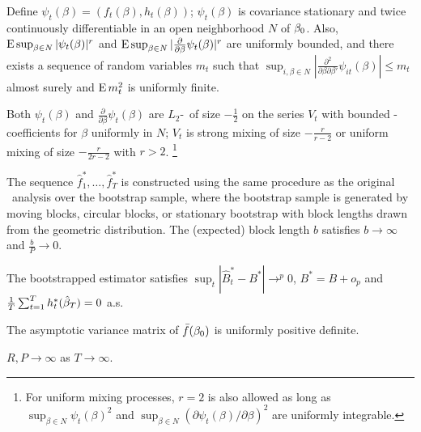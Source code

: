 \documentclass[12pt,fleqn]{article}
\begin{document}
\begin{asmp}\label{a2}
  Define $\psi_t(\beta) = (f_t(\beta), h_t(\beta))$; $\psi_t(\beta)$
  is covariance stationary and twice continuously differentiable in an
  open neighborhood $N$ of $\btrue$.  Also, $\operatorname{E} \sup_{\beta \in N}
  |\psi_t(\beta)|^r$ and $\operatorname{E}\sup_{\beta \in N}
  |\frac{\partial}{\partial \beta} \psi_t(\beta)|^r$ are uniformly
  bounded, and there exists a sequence of random variables $m_t$ such
  that $\sup_{i,\beta \in N} |\tfrac{\partial^2}{\partial
    \beta \partial \beta'} \psi_{it}(\beta)| \leq m_t$ almost surely
  and $\operatorname{E} m_t^2$ is uniformly finite.
\end{asmp}

\begin{asmp}\label{a3}
  Both $\psi_t(\beta)$ and $\frac{\partial}{\partial \beta}
  \psi_t(\beta)$ are $L_2$-\ned\ of size $-\frac12$ on the series
  $V_t$ with bounded \ned-coefficients for $\beta$ uniformly in $N$;
  $V_t$ is strong mixing of size $-\frac{r}{r-2}$ or uniform mixing of
  size $-\frac{r}{2r-2}$ with $r > 2$.%
  \footnote{For uniform mixing processes, $r = 2$ is also allowed as
    long as $\sup_{\beta \in N} \psi_t(\beta)^2$ and $\sup_{\beta \in
      N} (\partial \psi_t(\beta) / \partial \beta)^2$ are uniformly
    integrable.} %
\end{asmp}

\begin{asmp}\label{a4}
  The sequence $\hat f_1^{*},\dots,\hat f_T^{*}$ is constructed using
  the same procedure as the original \oos\ analysis over the bootstrap
  sample, where the bootstrap sample is generated by moving blocks,
  circular blocks, or stationary bootstrap with block lengths drawn
  from the geometric distribution.  The (expected) block length $b$
  satisfies $b \to \infty$ and $\frac{b}{P} \to 0$.
\end{asmp}

\begin{asmp}\label{a5}
  The bootstrapped estimator satisfies $\sup_t |\hat{B}_t^{*} - B^{*}|
  \to^p 0$, $B^{*} = B + o_p$ and $\frac1T \sum_{t=1}^T
  h_t^*(\btrue[*]) = 0$ a.s.
\end{asmp}

\begin{asmp}\label{a6}
  The asymptotic variance matrix of $\bar{f}(\btrue)$ is uniformly
  positive definite.
\end{asmp}

\begin{asmp}\label{a7}
  $R, P \to \infty$ as $T \to \infty$.
\end{asmp}
\end{document}
